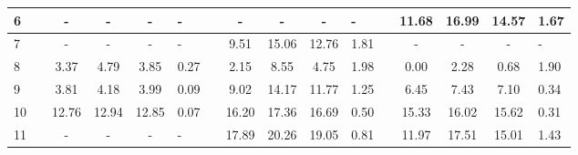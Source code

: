 \begin{table}
\begin{tabular}{>{\centering}p{0.2cm}cccc>{\centering}p{0.75cm}cccc>{\centering}p{0.75cm}cccc>{\centering}p{0.75cm}}
\cline{1-6} \cline{8-11} \cline{13-16} 
{\scriptsize{6}} &  & {\scriptsize{-}} & {\scriptsize{-}} & {\scriptsize{-}} & {\scriptsize{-}} &  & {\scriptsize{-}} & {\scriptsize{-}} & {\scriptsize{-}} & {\scriptsize{-}} &  & {\scriptsize{11.68}} & {\scriptsize{16.99}} & {\scriptsize{14.57}} & {\scriptsize{1.67}}\tabularnewline
\cline{1-6} \cline{8-11} \cline{13-16} 
{\scriptsize{7}} &  & {\scriptsize{-}} & {\scriptsize{-}} & {\scriptsize{-}} & {\scriptsize{-}} &  & {\scriptsize{9.51}} & {\scriptsize{15.06}} & {\scriptsize{12.76}} & {\scriptsize{1.81}} &  & {\scriptsize{-}} & {\scriptsize{-}} & {\scriptsize{-}} & {\scriptsize{-}}\tabularnewline
\cline{1-6} \cline{8-11} \cline{13-16} 
{\scriptsize{8}} &  & {\scriptsize{3.37}} & {\scriptsize{4.79}} & {\scriptsize{3.85}} & {\scriptsize{0.27}} &  & {\scriptsize{2.15}} & {\scriptsize{8.55}} & {\scriptsize{4.75}} & {\scriptsize{1.98}} &  & {\scriptsize{0.00}} & {\scriptsize{2.28}} & {\scriptsize{0.68}} & {\scriptsize{1.90}}\tabularnewline
\cline{1-6} \cline{8-11} \cline{13-16} 
{\scriptsize{9}} &  & {\scriptsize{3.81}} & {\scriptsize{4.18}} & {\scriptsize{3.99}} & {\scriptsize{0.09}} &  & {\scriptsize{9.02}} & {\scriptsize{14.17}} & {\scriptsize{11.77}} & {\scriptsize{1.25}} &  & {\scriptsize{6.45}} & {\scriptsize{7.43}} & {\scriptsize{7.10}} & {\scriptsize{0.34}}\tabularnewline
\cline{1-6} \cline{8-11} \cline{13-16} 
{\scriptsize{10}} &  & {\scriptsize{12.76}} & {\scriptsize{12.94}} & {\scriptsize{12.85}} & {\scriptsize{0.07}} &  & {\scriptsize{16.20}} & {\scriptsize{17.36}} & {\scriptsize{16.69}} & {\scriptsize{0.50}} &  & {\scriptsize{15.33}} & {\scriptsize{16.02}} & {\scriptsize{15.62}} & {\scriptsize{0.31}}\tabularnewline
\cline{1-6} \cline{8-11} \cline{13-16} 
{\scriptsize{11}} &  & {\scriptsize{-}} & {\scriptsize{-}} & {\scriptsize{-}} & {\scriptsize{-}} &  & {\scriptsize{17.89}} & {\scriptsize{20.26}} & {\scriptsize{19.05}} & {\scriptsize{0.81}} &  & {\scriptsize{11.97}} & {\scriptsize{17.51}} & {\scriptsize{15.01}} & {\scriptsize{1.43}}\tabularnewline
\hline 
\end{tabular}
\end{table}



